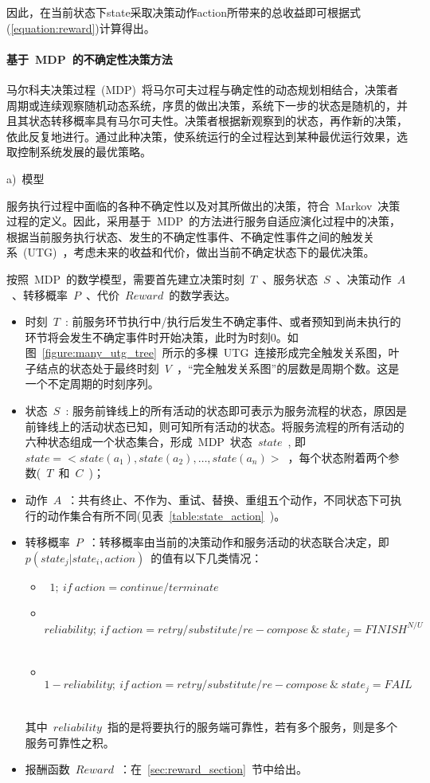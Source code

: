 因此，在当前状态下state采取决策动作action所带来的总收益即可根据式(\ref{equation:reward})计算得出。

\paragraph{基于~MDP~的不确定性决策方法}

马尔科夫决策过程~(MDP)~将马尔可夫过程与确定性的动态规划相结合，决策者周期或连续观察随机动态系统，序贯的做出决策，系统下一步的状态是随机的，并且其状态转移概率具有马尔可夫性。决策者根据新观察到的状态，再作新的决策，依此反复地进行。通过此种决策，使系统运行的全过程达到某种最优运行效果，选取控制系统发展的最优策略。

a)~{模型}

服务执行过程中面临的各种不确定性以及对其所做出的决策，符合~Markov~决策过程的定义。因此，采用基于~MDP~的方法进行服务自适应演化过程中的决策，根据当前服务执行状态、发生的不确定性事件、不确定性事件之间的触发关系~(UTG)~，考虑未来的收益和代价，做出当前不确定状态下的最优决策。

按照~MDP~的数学模型，需要首先建立决策时刻~$T$~、服务状态~$S$~、决策动作~$A$~、转移概率~$P$~、代价~$Reward$~的数学表达。
\begin{itemize}

\item 时刻~$T$~: 前服务环节执行中/执行后发生不确定事件、或者预知到尚未执行的环节将会发生不确定事件时开始决策，此时为时刻0。如图~\ref{figure:many_utg_tree}~所示的多棵~UTG~连接形成完全触发关系图，叶子结点的状态处于最终时刻~$V$~，“完全触发关系图”的层数是周期个数。这是一个不定周期的时刻序列。

\item 状态~$S$~: 服务前锋线上的所有活动的状态即可表示为服务流程的状态，原因是前锋线上的活动状态已知，则可知所有活动的状态。将服务流程的所有活动的六种状态组成一个状态集合，形成~MDP~状态~$state$~, 即~$state =  < state({a_1}),state({a_2}), \ldots ,state({a_n}) >$~，每个状态附着两个参数(~$T$~和~$C$~)；

\item 动作~$A$~：共有终止、不作为、重试、替换、重组五个动作，不同状态下可执行的动作集合有所不同(见表~\ref{table:state_action}~)。

\item 转移概率~$P$~：转移概率由当前的决策动作和服务活动的状态联合决定，即~$p(state_j|state_i,action)$~的值有以下几类情况：
\begin{itemize}
    \item ~$1;~if~action = continue/terminate$~
    \item ~$reliability;~if~action = retry/substitute/re-compose~ \& ~ state_j = FINIS{H^{N/U}}$~
    \item ~$1 - reliability;~if~action = retry/substitute/re-compose ~\& ~ state_j = FAIL$~
\end{itemize}
其中~$reliability$~指的是将要执行的服务端可靠性，若有多个服务，则是多个服务可靠性之积。

\item 报酬函数~$Reward$~：在~\ref{sec:reward_section}~节中给出。

\end{itemize}

